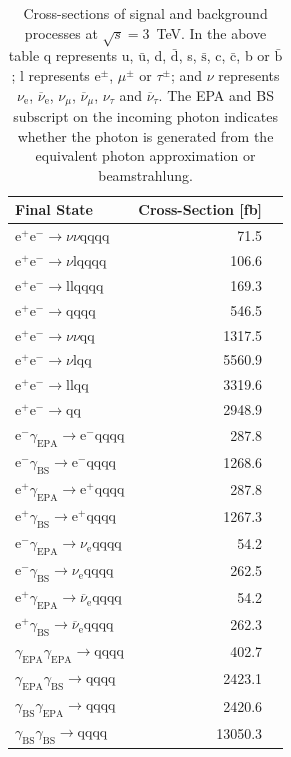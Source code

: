 \begin{table}[h!]
\centering
\begin{tabular}{ l r r }
\hline
Final State & Cross-Section [fb]  \\ 
\hline
$\text{e}^{+}\text{e}^{-} \rightarrow \nu{\nu}\text{qqqq}$ & 71.5 \\
$\text{e}^{+}\text{e}^{-} \rightarrow \nu\text{lqqqq}$ & 106.6 \\
$\text{e}^{+}\text{e}^{-} \rightarrow \text{llqqqq}$ & 169.3 \\
$\text{e}^{+}\text{e}^{-} \rightarrow \text{qqqq}$ & 546.5 \\
$\text{e}^{+}\text{e}^{-} \rightarrow \nu{\nu}\text{qq}$ & 1317.5 \\
$\text{e}^{+}\text{e}^{-} \rightarrow \nu\text{lqq}$ & 5560.9 \\
$\text{e}^{+}\text{e}^{-} \rightarrow \text{llqq}$ & 3319.6 \\
$\text{e}^{+}\text{e}^{-} \rightarrow \text{qq}$ & 2948.9 \\
$\text{e}^{-}\gamma_{\text{EPA}} \rightarrow \text{e}^{-}\text{qqqq}$ & 287.8 \\
$\text{e}^{-}\gamma_{\text{BS}} \rightarrow \text{e}^{-}\text{qqqq}$ & 1268.6 \\
$\text{e}^{+}\gamma_{\text{EPA}} \rightarrow \text{e}^{+}\text{qqqq}$ & 287.8 \\
$\text{e}^{+}\gamma_{\text{BS}} \rightarrow \text{e}^{+}\text{qqqq}$ & 1267.3 \\
$\text{e}^{-}\gamma_{\text{EPA}} \rightarrow \nu_{\text{e}}\text{qqqq}$ & 54.2 \\
$\text{e}^{-}\gamma_{\text{BS}} \rightarrow \nu_{\text{e}}\text{qqqq}$ & 262.5 \\
$\text{e}^{+}\gamma_{\text{EPA}} \rightarrow \overline{\nu}_{\text{e}}\text{qqqq}$ & 54.2 \\
$\text{e}^{+}\gamma_{\text{BS}} \rightarrow \overline{\nu}_{\text{e}}\text{qqqq}$ & 262.3 \\
$\gamma_{\text{EPA}}\gamma_{\text{EPA}} \rightarrow \text{qqqq}$ & 402.7 \\
$\gamma_{\text{EPA}}\gamma_{\text{BS}} \rightarrow \text{qqqq}$ & 2423.1 \\
$\gamma_{\text{BS}}\gamma_{\text{EPA}} \rightarrow \text{qqqq}$ & 2420.6 \\
$\gamma_{\text{BS}}\gamma_{\text{BS}} \rightarrow \text{qqqq}$ & 13050.3 \\
\hline
\end{tabular}
\caption[Cross-sections of signal and background processes at $\sqrt{s}=3$~TeV]{Cross-sections of signal and background processes at $\sqrt{s}=3$~TeV.  In the above table q represents u, $\bar{\text{u}}$, d, $\bar{\text{d}}$, s, $\bar{\text{s}}$, c, $\bar{\text{c}}$, b or $\bar{\text{b}}$;  l represents $\text{e}^{\pm}$, $\mu^{\pm}$ or $\tau^{\pm}$; and $\nu$ represents $\nu_{\text{e}}$, $\overline{\nu}_{\text{e}}$, $\nu_{\mu}$, $\overline{\nu}_{\mu}$, $\nu_{\tau}$ and $\overline{\nu}_{\tau}$.  The EPA and BS subscript on the incoming photon indicates whether the photon is generated from the equivalent photon approximation or beamstrahlung.}
\label{table:crosssection3000GeV}
\end{table}

